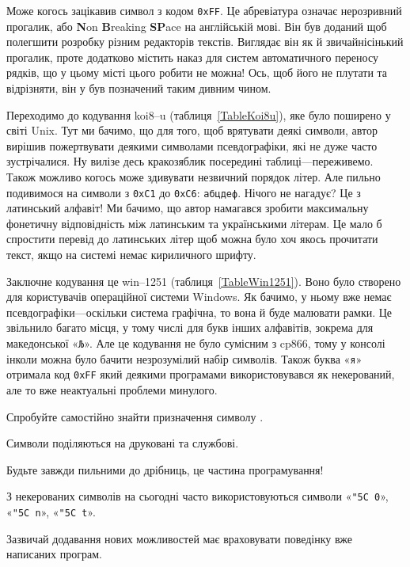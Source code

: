 \documentclass{book}
\newcommand{\bitstr}[1]{{\tt #1}}
\newcommand{\hexstr}[1]{{\tt 0x#1}}
\newcommand{\escape}[1]{\texttt{\char"5C #1}}
\newcommand{\chr}[1]{«\texttt{#1}»}
\newcommand{\chesc}[1]{\chr{\escape{#1}}}
\begin{document}
Може когось зацікавив символ  з кодом \hexstr{FF}.
Це абревіатура означає нерозривний прогалик, або \textbf{N}on \textbf{B}reaking \textbf{SP}ace на англійській мові.
Він був доданий щоб полегшити розробку різним редакторів текстів.
Виглядає він як й звичайнісінький прогалик, проте додатково містить наказ для систем автоматичного переносу рядків, що у цьому місті цього робити не можна!
Ось, щоб його не плутати та відрізняти, він у був позначений таким дивним чином.

Переходимо до кодування koi8--u (таблиця~\ref{TableKoi8u}), яке було поширено у світі Unix.
Тут ми бачимо, що для того, щоб врятувати деякі символи, автор вирішив пожертвувати деякими символами псевдографіки, які не дуже часто зустрічалися.
Ну вилізе десь кракозяблик посередині таблиці---переживемо.
Також можливо когось може здивувати незвичний порядок літер.
Але пильно подивимося на символи з \hexstr{C1} до \hexstr{C6}: \bitstr{абцдеф}.
Нічого не нагадує?
Це з латинський алфавіт!
Ми бачимо, що автор намагався зробити максимальну фонетичну відповідність між латинським та українськими літерам.
Це мало б спростити перевід до латинських літер щоб можна було хоч якось прочитати текст, якщо на системі немає кириличного шрифту.

Заключне кодування це win--1251 (таблиця~\ref{TableWin1251}).
Воно було створено для користувачів операційної системи Windows.
Як бачимо, у ньому вже немає псевдографіки---оскільки система графічна, то вона й буде малювати рамки.
Це звільнило багато місця, у тому числі для букв інших алфавітів, зокрема для македонської \chr{Љ}.
Але це кодування не було сумісним з cp866, тому у консолі інколи можна було бачити незрозумілий набір символів.
Також буква \chr{я} отримала код \hexstr{FF} який деякими програмами використовувався як некерований, але то вже неактуальні проблеми минулого.

\begin{exercise}
Спробуйте самостійно знайти призначення символу .
\end{exercise}

\begin{summary}
\item Символи поділяються на друковані та службові.
\item Будьте завжди пильними до дрібниць, це частина програмування!
\item З некерованих символів на сьогодні часто використовуються символи \chesc 0, \chesc n, \chesc t.
\item Зазвичай додавання нових можливостей має враховувати поведінку вже написаних програм.
\end{summary}

\printindex
\end{document}
